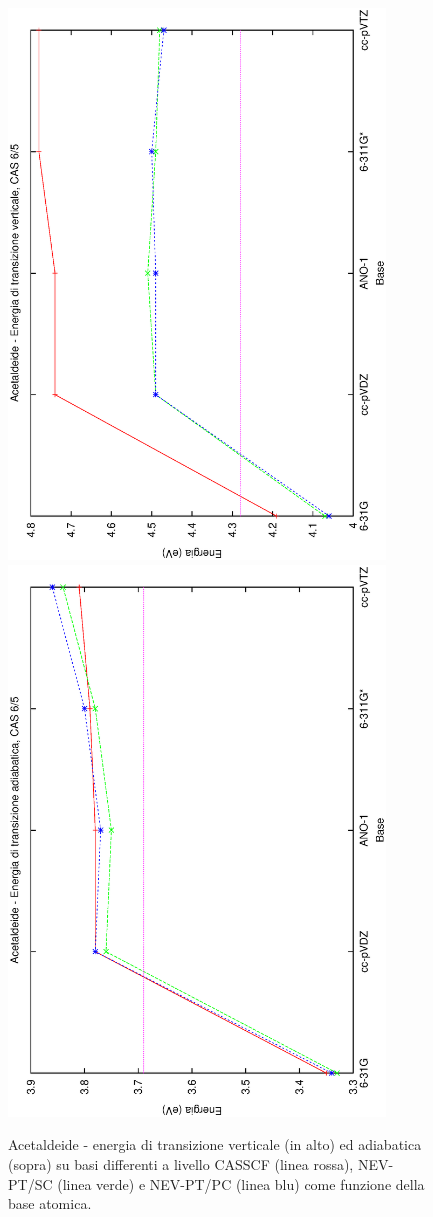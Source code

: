 \begin{figure}[ht]
\begin{center}
\includegraphics[angle=270,width=10cm,keepaspectratio]{immagini/acetaldeide/energie_vert_5.eps} \\
\includegraphics[angle=270,width=10cm,keepaspectratio]{immagini/acetaldeide/energie_adiab_5.eps}
\parbox[h]{12cm}{
\caption{\small Acetaldeide - energia di transizione verticale (in alto) ed adiabatica (sopra) su basi differenti a livello CASSCF (linea rossa), NEV-PT/SC (linea verde) e NEV-PT/PC (linea blu) come funzione della base atomica.}
\label{fig:acetaldeide_energie_vert_5}
}
\end{center}
\end{figure}
